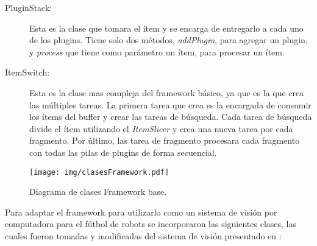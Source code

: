 \begin{description}
\item[PluginStack:] Esta es la clase que tomara el ítem y se encarga de
	entregarlo a cada uno de los plugins. Tiene solo dos métodos,
	\emph{addPlugin}, para agregar un plugin, y \emph{process} que tiene
	como parámetro un ítem, para procesar un ítem.

\item[ItemSwitch:] Esta es la clase mas compleja del framework básico, ya que es
	la que crea las múltiples tareas. La primera tarea que crea es la
	encargada de consumir los ítems del buffer y crear las tareas de
	búsqueda. Cada tarea de búsqueda divide el ítem utilizando el
	\emph{ItemSlicer} y crea una nueva tarea por cada fragmento. Por último,
	las tarea de fragmento procesara cada fragmento con todas las pilas de
	plugins de forma secuencial.

\end{description}

\begin{figure}[h]

	\texttt{[image: img/clasesFramework.pdf]}

	\caption{Diagrama de clases Framework base.}

\end{figure}

Para adaptar el framework para utilizarlo como un sistema de visión por
computadora para el fútbol de robots se incorporaron las siguientes clases, las
cuales fueron tomadas y modificadas del sistema de visión presentado en
\cite{torres2014}:


